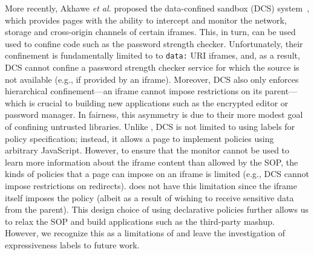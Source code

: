More recently, Akhawe \emph{et al.} proposed the data-confined
sandbox (DCS) system~\cite{Akhawe2013}, which provides pages with the
ability to intercept and monitor the network, storage and cross-origin
channels of certain iframes.
%
This, in turn, can be used used to confine code such as the password
strength checker.
%
Unfortunately, their confinement is fundamentally limited to to
\verb|data:| URI iframes, and, as a result, DCS cannot confine a
password strength checker service for which the source is not
available (e.g., if provided by an iframe).
%
Moreover, DCS also only enforces hierarchical confinement---an iframe
cannot impose restrictions on its parent---which is crucial to
building new applications such as the encrypted editor or password
manager.
%
In fairness, this asymmetry is due to their more modest goal of
confining untrusted libraries.
%
Unlike \sys{}, DCS is not limited to using labels for policy
specification; instead, it allows a page to implement policies using
arbitrary JavaScript.
%
However, to ensure that the monitor cannot be used to learn more
information about the iframe content than allowed by the SOP, the
kinds of policies that a page can impose on an iframe is limited
(e.g., DCS cannot impose restrictions on redirects).
%
\sys{} does not have this limitation since the iframe itself imposes
the policy (albeit as a result of wishing to receive sensitive data
from the parent).
%
This design choice of using declarative policies further allows us to
relax the SOP and build applications such as the third-party mashup.
%
However, we recognize this as a limitations of \sys{} and leave the
investigation of expressiveness labels to future work.




